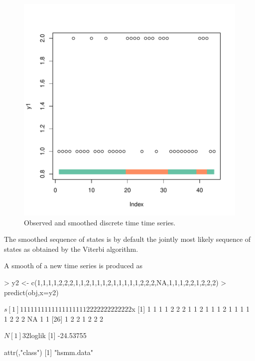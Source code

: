 \documentclass{article}
\begin{document}
\begin{Schunk}
\end{Schunk}

\begin{figure}[h]
  \centering
  \includegraphics{fig/smooth-smooth1}
  \caption{Observed and smoothed discrete time time series.}
  \label{fig:smooth1}
\end{figure}

The smoothed sequence of states is by default the jointly most likely
sequence of states as obtained by the Viterbi algorithm.

A smooth of a new time series is produced as
\begin{Schunk}
\begin{Sinput}
> y2 <- c(1,1,1,1,2,2,2,1,1,2,1,1,1,2,1,1,1,1,1,2,2,2,NA,1,1,1,2,2,1,2,2,2)
> predict(obj,x=y2)
\end{Sinput}
\begin{Soutput}
$s
 [1] 1 1 1 1 1 1 1 1 1 1 1 1 1 1 1 1 1 1 1 2 2 2 2 2 2 2 2 2 2 2 2 2

$x
 [1]  1  1  1  1  2  2  2  1  1  2  1  1  1  2  1  1  1  1  1  2  2  2 NA  1  1
[26]  1  2  2  1  2  2  2

$N
[1] 32

$loglik
[1] -24.53755

attr(,"class")
[1] "hsmm.data"
\end{Soutput}
\end{Schunk}
\end{document}
